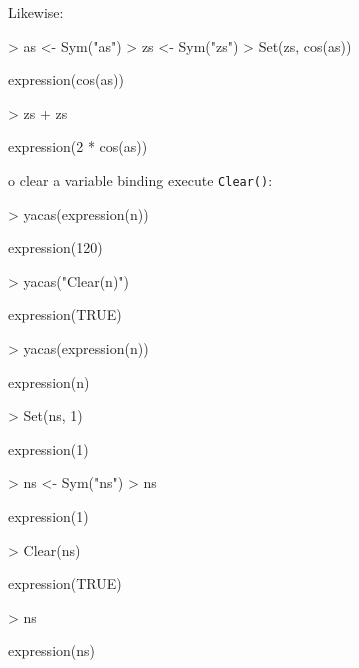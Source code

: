 \documentclass[]{article}
\newcommand{\code}[1]{{\tt #1}}
\begin{document}
Likewise:
\begin{Schunk}
\begin{Sinput}
> as <- Sym("as")
> zs <- Sym("zs")
> Set(zs, cos(as))
\end{Sinput}
\begin{Soutput}
expression(cos(as))
\end{Soutput}
\begin{Sinput}
> zs + zs
\end{Sinput}
\begin{Soutput}
expression(2 * cos(as))
\end{Soutput}
\end{Schunk}


o clear a variable
binding execute \code{Clear()}:
\begin{Schunk}
\begin{Sinput}
> yacas(expression(n))
\end{Sinput}
\begin{Soutput}
expression(120)
\end{Soutput}
\begin{Sinput}
> yacas("Clear(n)")
\end{Sinput}
\begin{Soutput}
expression(TRUE)
\end{Soutput}
\begin{Sinput}
> yacas(expression(n))
\end{Sinput}
\begin{Soutput}
expression(n)
\end{Soutput}
\end{Schunk}

\begin{Schunk}
\begin{Sinput}
> Set(ns, 1)
\end{Sinput}
\begin{Soutput}
expression(1)
\end{Soutput}
\begin{Sinput}
> ns <- Sym("ns")
> ns
\end{Sinput}
\begin{Soutput}
expression(1)
\end{Soutput}
\begin{Sinput}
> Clear(ns)
\end{Sinput}
\begin{Soutput}
expression(TRUE)
\end{Soutput}
\begin{Sinput}
> ns
\end{Sinput}
\begin{Soutput}
expression(ns)
\end{Soutput}
\end{Schunk}
\end{document}

